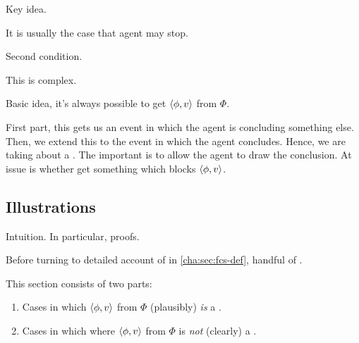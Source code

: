 \begin{note}
  Key idea.

  It is usually the case that agent may stop.
\end{note}

\begin{note}
  Second condition.

  This is complex.

  Basic idea, it's always possible to get \(\langle \phi, v \rangle\) from \(\Phi\).

  First part, this gets us an event in which the agent is concluding something else.
  Then, we extend this to the event in which the agent concludes.
  Hence, we are taking about a \pevent{}.
  The important is to allow the agent to draw the conclusion.
  At issue is whether get something which blocks \(\langle \phi, v \rangle\).
\end{note}

\subsection{Illustrations}
\label{cha:fcs:sec:illu}

\begin{note}
  Intuition.
  In particular, proofs.

  Before turning to detailed account of  in \autoref{cha:sec:fcs-def}, handful of .

  This section consists of two parts:

  \begin{enumerate}[label=]
  \item

    Cases in which \(\langle \phi, v \rangle\) from \(\Phi\) (plausibly) \emph{is} a \fc{}.
  \item

    Cases in which where \(\langle \phi, v \rangle\) from \(\Phi\) is \emph{not} (clearly) a \fc{}.
  \end{enumerate}
\end{note}

\subsubsection{}
\label{cha:fcs:sec:illu:yes}


